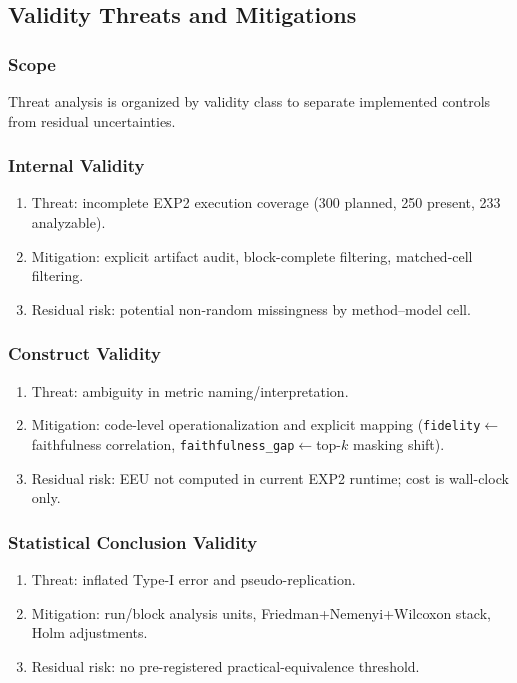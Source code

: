 \documentclass[twoside,11pt]{article}
\begin{document}
\subsection{Validity Threats and Mitigations}
\subsubsection{Scope}
Threat analysis is organized by validity class to separate implemented controls
from residual uncertainties.

\subsubsection{Internal Validity}
\begin{enumerate}[leftmargin=*]
    \item Threat: incomplete EXP2 execution coverage (300 planned, 250 present, 233 analyzable).
    \item Mitigation: explicit artifact audit, block-complete filtering, matched-cell filtering.
    \item Residual risk: potential non-random missingness by method--model cell.
\end{enumerate}

\subsubsection{Construct Validity}
\begin{enumerate}[leftmargin=*]
    \item Threat: ambiguity in metric naming/interpretation.
    \item Mitigation: code-level operationalization and explicit mapping
    (\texttt{fidelity}$\leftarrow$faithfulness correlation,
    \texttt{faithfulness\_gap}$\leftarrow$top-$k$ masking shift).
    \item Residual risk: EEU not computed in current EXP2 runtime; cost is wall-clock only.
\end{enumerate}

\subsubsection{Statistical Conclusion Validity}
\begin{enumerate}[leftmargin=*]
    \item Threat: inflated Type-I error and pseudo-replication.
    \item Mitigation: run/block analysis units, Friedman+Nemenyi+Wilcoxon stack, Holm adjustments.
    \item Residual risk: no pre-registered practical-equivalence threshold.
\end{enumerate}
\end{document}
